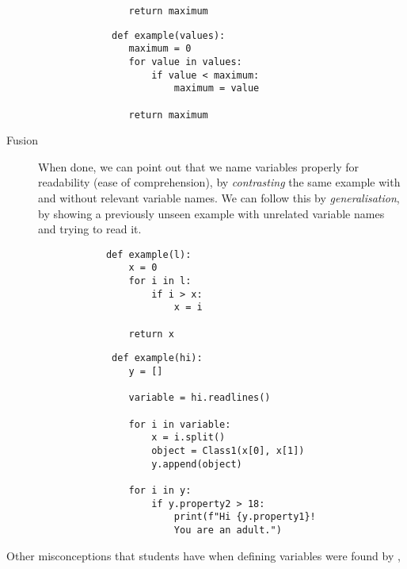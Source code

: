 \begin{description}
\begin{minipage}[t]{0.45\columnwidth}
\begin{verbatim}
                return maximum
        \end{verbatim}
    \end{minipage}
\hfill
    \begin{minipage}[t]{0.45\columnwidth}
        \begin{verbatim}
             def example(values):
                maximum = 0
                for value in values:
                    if value < maximum:
                        maximum = value
    
                return maximum
      \end{verbatim}
    \end{minipage}
\newline
    \item [Fusion] When done, we can point out that we name variables 
properly for readability (ease of comprehension), by \emph{contrasting} 
the same example with and without relevant variable names. We can 
follow this by \emph{generalisation}, by showing a previously unseen 
example with unrelated variable names and trying to read it.
    
    \hfill
     \begin{minipage}[t]{0.45\columnwidth}
        \begin{verbatim}
            def example(l):
                x = 0
                for i in l:
                    if i > x:
                        x = i
    
                return x
        \end{verbatim}
    \end{minipage}
\hfill
    \begin{minipage}[t]{0.45\columnwidth}
        \begin{verbatim}
             def example(hi):
                y = []
                
                variable = hi.readlines()
    
                for i in variable:
                    x = i.split()
                    object = Class1(x[0], x[1])
                    y.append(object)
                    
                for i in y:
                    if y.property2 > 18:
                        print(f"Hi {y.property1}! 
                        You are an adult.")
        \end{verbatim}
    \end{minipage}
\hfill
    
\end{description}
\vspace{5pt}
Other misconceptions that students have when defining variables were found 
by \textcite{GuoMarkelZhang2020},

